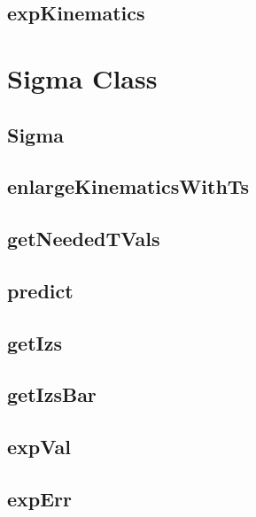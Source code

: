 \documentclass{book}
\begin{document}
\section{expKinematics}

\chapter{Sigma Class}

\section{Sigma}

\section{enlargeKinematicsWithTs}

\section{getNeededTVals}

\section{predict}

\section{getIzs}

\section{getIzsBar}

\section{expVal}

\section{expErr}
\end{document}
